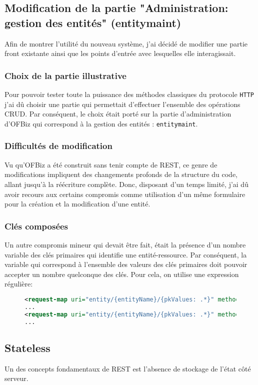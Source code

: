 \subsection{Modification de la partie "Administration: gestion des entités"  (entitymaint)  }
Afin de montrer l'utilité du nouveau système, j'ai décidé de modifier une partie front existante ainsi que les points d'entrée avec lesquelles elle interagissait.
\subsubsection{Choix de la partie illustrative}
Pour pouvoir tester toute la puissance des méthodes classiques du protocole \verb|HTTP| j'ai dû choisir une partie qui permettait d'effectuer l'ensemble des opérations CRUD. Par conséquent, le choix était porté sur la partie d'administration d'OFBiz qui correspond à la gestion des entités : \verb|entitymaint|.
\subsubsection{Difficultés de modification} 
Vu qu'OFBiz a été construit sans tenir compte de REST, ce genre de modifications impliquent des changements profonds de la structure du code, allant jusqu'à la réécriture complète. Donc, disposant d'un temps limité, j'ai dû avoir recours aux certains compromis comme utilisation d'un même formulaire pour la création et la modification d'une entité.
\subsubsection{Clés composées}
Un autre compromis mineur qui devait être fait, était la présence d'un nombre variable des clés primaires qui identifie une entité-ressource. Par conséquent, la variable qui correspond à l'ensemble des valeurs des clés primaires doit pouvoir accepter un nombre quelconque des clés. Pour cela, on utilise une expression régulière: 

\begin{figure}[h!]
	\begin{lstlisting}[frame=leftline,language=xml,frameround=tttt]
<request-map uri="entity/{entityName}/{pkValues: .*}" method="get">
...
<request-map uri="entity/{entityName}/{pkValues: .*}" method="delete">
...

	\end{lstlisting}
\end{figure}  
\subsection{Stateless}
Un des concepts fondamentaux de REST est l'absence de stockage de l'état côté serveur. 

